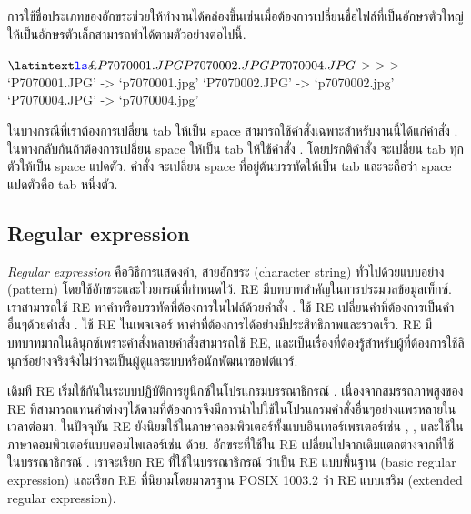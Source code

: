 \begin{thwbr}
การใช้ชื่อประเภทของอักขระช่วยให้ทำงานได้คล่องขึ้นเช่นเมื่อต้องการเปลี่ยนชื่อไฟล์ที่เป็นอักษรตัวใหญ่ให้เป็นอักษรตัวเล็กสามารถทำได้ตามตัวอย่างต่อไปนี้.
\begin{MyExample}
\begin{MyEx}
$ \cin{ls}
P7070001.JPG  P7070002.JPG  P7070004.JPG
$ 
> 
> 
> 
`P7070001.JPG' -> `p7070001.jpg'
`P7070002.JPG' -> `p7070002.jpg'
`P7070004.JPG' -> `p7070004.jpg'
\end{MyEx}
\end{MyExample}

\medskip
ในบางกรณีที่เราต้องการเปลี่ยน tab ให้เป็น space สามารถใช้คำสั่งเฉพาะสำหรับงานนี้ได้แก่คำสั่ง . ในทางกลับกันถ้าต้องการเปลี่ยน space ให้เป็น tab ให้ใช้คำสั่ง . โดยปรกติคำสั่ง  จะเปลี่ยน tab ทุกตัวให้เป็น space แปดตัว. คำสั่ง  จะเปลี่ยน space ที่อยู่ต้นบรรทัดให้เป็น tab และจะถือว่า space แปดตัวคือ tab หนึ่งตัว.


\subsection{Regular expression}\label{sec:re}
\emph{Regular expression} คือวิธีการแสดงคำ, สายอักขระ (character string) ทั่วไปด้วยแบบอย่าง (pattern) โดยใช้อักขระและไวยกรณ์ที่กำหนดไว้. RE มีบทบาทสำคัญในการประมวลข้อมูลเท็กซ์. เราสามารถใช้ RE หาคำหรือบรรทัดที่ต้องการในไฟล์ด้วยคำสั่ง . ใช้ RE เปลี่ยนคำที่ต้องการเป็นคำอื่นๆด้วยคำสั่ง . ใช้ RE ในเพจเจอร์  หาคำที่ต้องการได้อย่างมีประสิทธิภาพและรวดเร็ว. RE มีบทบาทมากในลินุกซ์เพราะคำสั่งหลายคำสั่งสามารถใช้ RE, และเป็นเรื่องที่ต้องรู้สำหรับผู้ที่ต้องการใช้ลินุกซ์อย่างจริงจังไม่ว่าจะเป็นผู้ดูแลระบบหรือนักพัฒนาซอฟต์แวร์.

เดิมที RE เริ่มใช้กันในระบบปฏิบัติการยูนิกซ์ในโปรแกรมบรรณาธิกรณ์ . เนื่องจากสมรรถภาพสูงของ RE ที่สามารถแทนคำต่างๆได้ตามที่ต้องการจึงมีการนำไปใช้ในโปรแกรมคำสั่งอื่นๆอย่างแพร่หลายในเวลาต่อมา. ในปัจจุบัน RE ยังนิยมใช้ในภาษาคอมพิวเตอร์ทั้งแบบอินเทอร์เพรเตอร์เช่น , ,  และใช้ในภาษาคอมพิวเตอร์แบบคอมไพเลอร์เช่น  ด้วย. อักขระที่ใช้ใน RE เปลี่ยนไปจากเดิมแตกต่างจากที่ใช้ในบรรณาธิกรณ์ . เราจะเรียก RE ที่ใช้ในบรรณาธิกรณ์  ว่าเป็น RE แบบพื้นฐาน (basic regular expression) และเรียก RE ที่นิยามโดยมาตรฐาน POSIX 1003.2 ว่า RE แบบเสริม (extended regular expression).



\end{thwbr}
